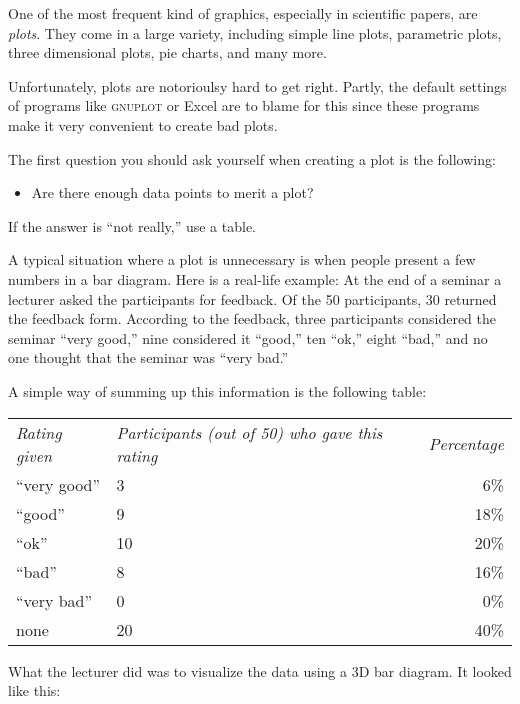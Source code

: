 One of the most frequent kind of graphics, especially in scientific
papers, are \emph{plots}. They come in a large variety, including
simple line plots, parametric plots, three dimensional plots, pie
charts, and many more.

Unfortunately, plots are notorioulsy hard to get right. Partly, the
default settings of programs like \textsc{gnuplot} or Excel are to
blame for this since these programs make it very convenient to create
bad plots.

The first question you should ask yourself when creating a plot is the
following:
\begin{itemize}
\item
  Are there enough data points to merit a plot?
\end{itemize}

If the answer is ``not really,'' use a table.

A typical situation where a plot is unnecessary is when people present
a few numbers in a bar diagram. Here is a real-life example: At the
end of a seminar a lecturer asked the participants for feedback. Of
the 50 participants, 30 returned the feedback form. According to the
feedback, three participants considered the seminar ``very good,''
nine considered it  ``good,'' ten ``ok,'' eight ``bad,'' and no one thought 
that the seminar was ``very bad.''

A simple way of summing up this information is the following table:

\medskip
\begin{tabular}{lp{3.75cm}r}
  \emph{Rating given} & \raggedright\emph{Participants (out of 50) who gave this rating} &
  \emph{Percentage} \\[2mm]
  ``very good'' & \hfil\hphantom{0}3\hfil & \hphantom{0}6\% \\
  ``good'' & \hfil\hphantom{0}9\hfil & 18\% \\
  ``ok'' & \hfil10\hfil & 20\% \\
  ``bad'' & \hfil\hphantom{0}8\hfil & 16\% \\
  ``very bad'' & \hfil\hphantom{0}0\hfil & \hphantom{0}0\% \\[2mm]
  none & \hfil20\hfil & 40\% \\
\end{tabular}

\bigskip
What the lecturer did was to visualize the data using a 3D bar
diagram. It looked like this:

